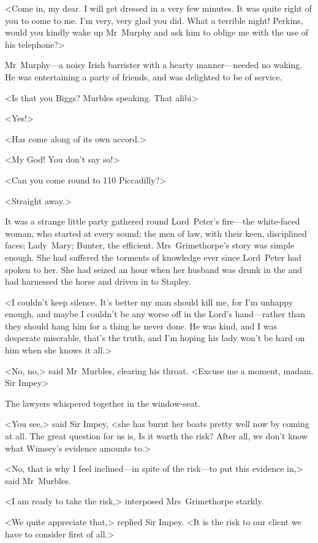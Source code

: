 <Come in, my dear. I will get dressed in a very few minutes. It was quite right of you to come to me. I'm very, very glad you did. What a terrible night! Perkins, would you kindly wake up Mr~Murphy and ask him to oblige me with the use of his telephone?>

Mr~Murphy—a noisy Irish barrister with a hearty manner—needed no waking. He was entertaining a party of friends, and was delighted to be of service.

<Is that you Biggs? Murbles speaking. That alibi\longdash>

<Yes!>

<Has come along of its own accord.>

<My God! You don't say so!>

<Can you come round to 110 Piccadilly?>

<Straight away.>

It was a strange little party gathered round Lord~Peter's fire—the white-faced woman, who started at every sound; the men of law, with their keen, disciplined faces; Lady~Mary; Bunter, the efficient. Mrs~Grimethorpe's story was simple enough. She had suffered the torments of knowledge ever since Lord~Peter had spoken to her. She had seized an hour when her husband was drunk in the  and had harnessed the horse and driven in to Stapley.

<I couldn't keep silence. It's better my man should kill me, for I'm unhappy enough, and maybe I couldn't be any worse off in the Lord's hand—rather than they should hang him for a thing he never done. He was kind, and I was desperate miserable, that's the truth, and I'm hoping his lady won't be hard on him when she knows it all.>

<No, no,> said Mr~Murbles, clearing his throat. <Excuse me a moment, madam. Sir Impey\longdash>

The lawyers whispered together in the window-seat.

<You see,> said Sir Impey, <she has burnt her boats pretty well now by coming at all. The great question for us is, Is it worth the risk? After all, we don't know what Wimsey's evidence amounts to.>

<No, that is why I feel inclined—in spite of the risk—to put this evidence in,> said Mr~Murbles.

<I am ready to take the risk,> interposed Mrs~Grimethorpe starkly.

<We quite appreciate that,> replied Sir Impey. <It is the risk to our client we have to consider first of all.>

